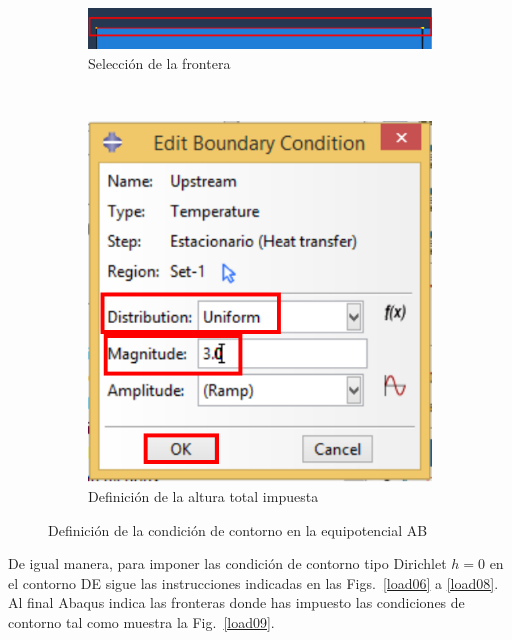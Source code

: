 \begin{figure}
    \begin{subfigure}[!h]{0.52\textwidth}
      \includegraphics[width=\textwidth]{./body/images/load04.pdf}
      \caption{Selección de la frontera}
      \label{load04}
    \end{subfigure}%
    ~ %
    \begin{subfigure}[!h]{0.45\textwidth}
      \includegraphics[width=\textwidth]{./body/images/load05.pdf}
      \caption{Definición de la altura total impuesta}
      \label{load05}
    \end{subfigure}%
    \caption{Definición de la condición de contorno en la
      equipotencial AB}
  \end{figure}

  De igual manera, para imponer las condición de contorno tipo
  Dirichlet $h=0$ en el contorno DE sigue las instrucciones indicadas
  en las Figs.~\ref{load06} a \ref{load08}. Al final Abaqus indica las
  fronteras donde has impuesto las condiciones de contorno tal como
  muestra la Fig.~\ref{load09}.

